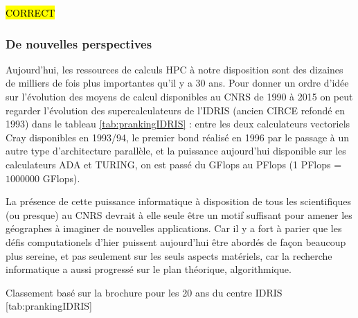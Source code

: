 \hl{CORRECT}
\subsubsection{De nouvelles perspectives}
\label{sssec:synthese}

Aujourd'hui, les ressources de calculs HPC à notre disposition sont des dizaines de milliers de fois plus importantes qu'il y a 30 ans. Pour donner un ordre d'idée sur l'évolution des moyens de calcul disponibles au CNRS de 1990 à 2015 on peut regarder l'évolution des supercalculateurs de l'IDRIS (ancien CIRCE refondé en 1993) dans le tableau \ref{tab:prankingIDRIS} : entre les deux calculateurs vectoriels Cray disponibles en 1993/94, le premier bond réalisé en 1996 par le passage à un autre type d'architecture parallèle, et la puissance aujourd'hui disponible sur les calculateurs ADA et TURING, on est passé du GFlops au PFlops (1 PFlops = $\num{1000000}$ GFlops).

La présence de cette puissance informatique à disposition de tous les scientifiques (ou presque) au CNRS devrait à elle seule être un motif suffisant pour amener les géographes à imaginer de nouvelles applications. Car il y a fort à parier que les défis computationels d'hier puissent aujourd'hui être abordés de façon beaucoup plus sereine, et pas seulement sur les seuls aspects matériels, car la recherche informatique a aussi progressé sur le plan théorique, algorithmique.

\begin{table}[!htbp]
\begin{sidecaption}{Classement basé sur la brochure pour les 20 ans du centre IDRIS}
	[tab:prankingIDRIS]
	\centering
\end{sidecaption}
\end{table}

